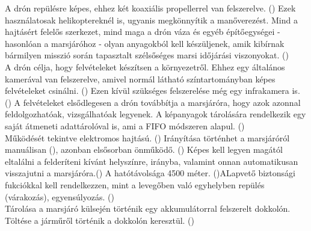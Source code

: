 \documentclass[12pt]{report}
\begin{document}
A drón repülésre képes, ehhez két koaxiális propellerrel van felszerelve. () Ezek használatosak helikoptereknél is, ugyanis megkönnyítik a manőverezést. Mind a hajtásért felelős szerkezet, mind maga a drón váza és egyéb építőegységei - hasonlóan a marsjáróhoz - olyan anyagokból kell készüljenek, amik kibírnak bármilyen misszió során tapasztalt szélsőséges marsi időjárási viszonyokat. ()\\

A drón célja, hogy felvételeket készítsen a környezetről. Ehhez egy általános kamerával van felszerelve, amivel normál látható színtartományban képes felvételeket csinálni. () Ezen kívül szükséges felszerelése még egy infrakamera is. () A felvételeket elsődlegesen a drón továbbítja a marsjáróra, hogy azok azonnal feldolgozhatóak, vizsgálhatóak legyenek. A képanyagok tárolására rendelkezik egy saját átmeneti adattárolóval is, ami a FIFO módszeren alapul. ()\\

Működését tekintve elektromos hajtású. () Irányítása történhet a marsjáróról manuálisan (), azonban elsősorban önműködő. () Képes kell legyen magától eltalálni a felderíteni kívánt helyszínre, irányba, valamint onnan automatikusan visszajutni a marsjáróra.() A hatótávolsága 4500 méter. ()ALapvető biztonsági fukciókkal kell rendelkezzen, mint a levegőben való egyhelyben repülés (várakozás), egyensúlyozás. ()\\

Tárolása a marsjáró külsején történik egy akkumulátorral felszerelt dokkolón. Töltése a járműről történik a dokkolón keresztül. ()
\end{document}

